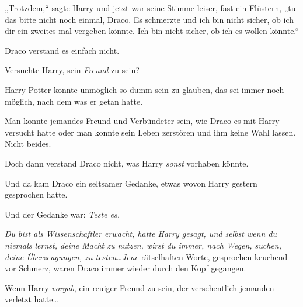 „Trotzdem,“ sagte Harry und jetzt war seine Stimme leiser, fast ein Flüstern, „tu das bitte nicht noch einmal, Draco. Es schmerzte und ich bin nicht sicher, ob ich dir ein zweites mal vergeben könnte. Ich bin nicht sicher, ob ich es wollen könnte.“

Draco verstand es einfach nicht.

Versuchte Harry, sein \emph{Freund} zu sein?

Harry Potter konnte unmöglich so dumm sein zu glauben, das sei immer noch möglich, nach dem was er getan hatte.

Man konnte jemandes Freund und Verbündeter sein, wie Draco es mit Harry versucht hatte oder man konnte sein Leben zerstören und ihm keine Wahl lassen. Nicht beides.

Doch dann verstand Draco nicht, was Harry \emph{sonst} vorhaben könnte.

Und da kam Draco ein seltsamer Gedanke, etwas wovon Harry gestern gesprochen hatte.

Und der Gedanke war: \emph{Teste es.}

\emph{Du bist als Wissenschaftler erwacht, hatte Harry gesagt, und selbst wenn du niemals lernst, deine Macht zu nutzen, wirst du immer, nach Wegen, suchen, deine Überzeugungen, zu testen…Jene} rätselhaften Worte, gesprochen keuchend vor Schmerz, waren Draco immer wieder durch den Kopf gegangen.

Wenn Harry \emph{vorgab}, ein reuiger Freund zu sein, der versehentlich jemanden verletzt hatte…

